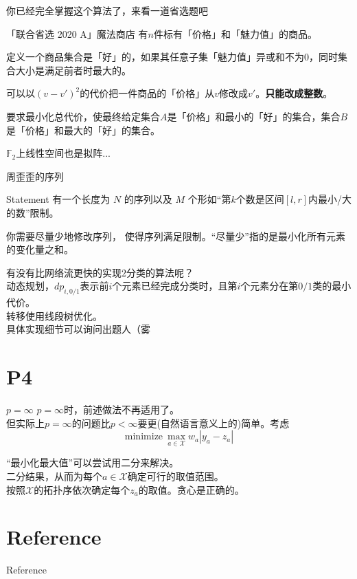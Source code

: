 \documentclass{beamer}
\begin{document}
\begin{frame}{你已经完全掌握这个算法了，来看一道省选题吧}
	\begin{block}{「联合省选 2020 A」魔法商店}
		有$n$件标有「价格」和「魅力值」的商品。
		
		定义一个商品集合是「好」的，如果其任意子集「魅力值」异或和不为$0$，同时集合大小是满足前者时最大的。
		
		可以以$(v - v')^2$的代价把一件商品的「价格」从$v$修改成$v'$。\textbf{只能改成整数}。
		
		要求最小化总代价，使最终给定集合$A$是「价格」和最小的「好」的集合，集合$B$是「价格」和最大的「好」的集合。
	\end{block}
\pause
$\mathbb F_2$上线性空间也是拟阵...

\end{frame}
\begin{frame}{周歪歪的序列}
	\begin{block}{Statement}
		有一个长度为 $N$ 的序列以及 $M$ 个形如“第$k$个数是区间$[l, r]$内最小/大的数”限制。
		
		你需要尽量少地修改序列， 使得序列满足限制。“尽量少”指的是最小化所有元素的变化量之和。
	\end{block}\pause

	有没有比网络流更快的实现$2$分类的算法呢？\pause\\
	
	动态规划，$dp_{i, 0/1}$表示前$i$个元素已经完成分类时，且第$i$个元素分在第$0/1$类的最小代价。\\
	
	转移使用线段树优化。\\
	
	具体实现细节可以询问出题人（雾
\end{frame}
\section{P4}
\begin{frame}{$p = \infty$}
	$p = \infty$时，前述做法不再适用了。\pause\\
	
	但实际上$p = \infty$的问题比$p < \infty$要更(自然语言意义上的)简单。考虑$$\mathrm{minimize}\ \max_{a \in \mathcal X}w_a|y_a - z_a|$$
	
	\pause “最小化最大值”可以尝试用二分来解决。\\
	
	\pause 二分结果，从而为每个$a \in \mathcal X$确定可行的取值范围。\\
	
	按照$\mathcal X$的拓扑序依次确定每个$z_a$的取值。贪心是正确的。
\end{frame}

\section{Reference}
\begin{frame}{Reference}


\end{frame}
\end{document}
